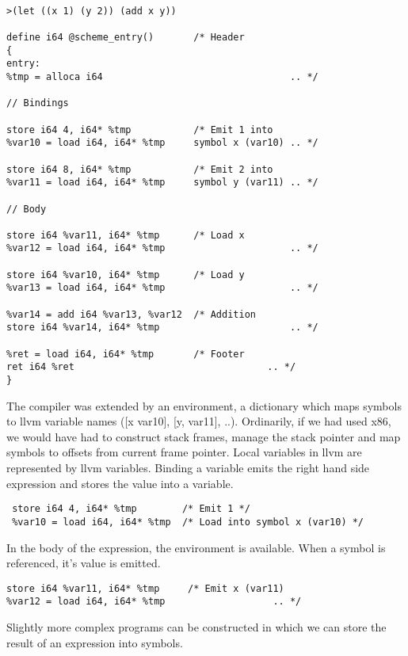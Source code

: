 \documentclass{article}
\begin{document}
\begin{verbatim}

>(let ((x 1) (y 2)) (add x y)) 

define i64 @scheme_entry()       /* Header
{                    
entry: 
%tmp = alloca i64                                 .. */

// Bindings       

store i64 4, i64* %tmp           /* Emit 1 into        
%var10 = load i64, i64* %tmp     symbol x (var10) .. */

store i64 8, i64* %tmp           /* Emit 2 into           
%var11 = load i64, i64* %tmp     symbol y (var11) .. */

// Body

store i64 %var11, i64* %tmp      /* Load x      
%var12 = load i64, i64* %tmp                      .. */

store i64 %var10, i64* %tmp      /* Load y
%var13 = load i64, i64* %tmp                      .. */

%var14 = add i64 %var13, %var12  /* Addition
store i64 %var14, i64* %tmp                       .. */

%ret = load i64, i64* %tmp       /* Footer
ret i64 %ret                                  .. */
}

\end{verbatim}

The compiler was extended by an environment, a dictionary which maps symbols to llvm variable names ([x var10], [y, var11], ..). Ordinarily, if we had used x86, we would have had to construct stack frames, manage the stack pointer and map symbols to offsets from current frame pointer. Local variables in llvm are represented by llvm variables. Binding a variable emits the right hand side expression and stores the value into a variable.

\begin{verbatim}
 store i64 4, i64* %tmp        /* Emit 1 */
 %var10 = load i64, i64* %tmp  /* Load into symbol x (var10) */  
\end{verbatim}

 In the body of the expression, the environment is available. When a symbol is referenced, it's value is emitted.
 
\begin{verbatim}
store i64 %var11, i64* %tmp     /* Emit x (var11)     
%var12 = load i64, i64* %tmp                   .. */
\end{verbatim}

Slightly more complex programs can be constructed in which we can store the result of an expression into symbols. 
\end{document}
